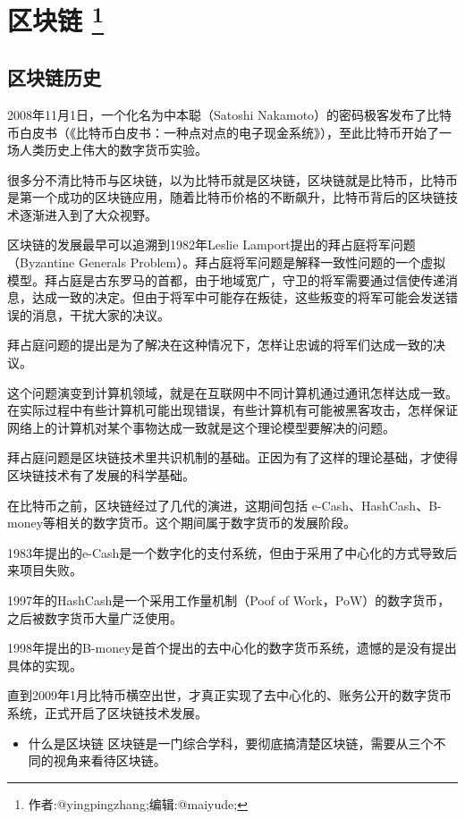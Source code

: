 \documentclass[]{ctexbook}
\providecommand{\tightlist}{%
  \setlength{\itemsep}{0pt}\setlength{\parskip}{0pt}}
\begin{document}
\chapter[区块链 ]{\texorpdfstring{区块链 \footnote{作者:@yingpingzhang;编辑:@maiyude;}}{区块链 }}

\hypertarget{blockchain-history}{%
\section{区块链历史}\label{blockchain-history}}

2008年11月1日，一个化名为中本聪（Satoshi Nakamoto）的密码极客发布了比特币白皮书（《比特币白皮书：一种点对点的电子现金系统》），至此比特币开始了一场人类历史上伟大的数字货币实验。

很多分不清比特币与区块链，以为比特币就是区块链，区块链就是比特币，比特币是第一个成功的区块链应用，随着比特币价格的不断飙升，比特币背后的区块链技术逐渐进入到了大众视野。

区块链的发展最早可以追溯到1982年Leslie Lamport提出的拜占庭将军问题（Byzantine Generals Problem）。拜占庭将军问题是解释一致性问题的一个虚拟模型。拜占庭是古东罗马的首都，由于地域宽广，守卫的将军需要通过信使传递消息，达成一致的决定。但由于将军中可能存在叛徒，这些叛变的将军可能会发送错误的消息，干扰大家的决议。

拜占庭问题的提出是为了解决在这种情况下，怎样让忠诚的将军们达成一致的决议。

这个问题演变到计算机领域，就是在互联网中不同计算机通过通讯怎样达成一致。在实际过程中有些计算机可能出现错误，有些计算机有可能被黑客攻击，怎样保证网络上的计算机对某个事物达成一致就是这个理论模型要解决的问题。

拜占庭问题是区块链技术里共识机制的基础。正因为有了这样的理论基础，才使得区块链技术有了发展的科学基础。

在比特币之前，区块链经过了几代的演进，这期间包括 e-Cash、HashCash、B-money等相关的数字货币。这个期间属于数字货币的发展阶段。

1983年提出的e-Cash是一个数字化的支付系统，但由于采用了中心化的方式导致后来项目失败。

1997年的HashCash是一个采用工作量机制（Poof of Work，PoW）的数字货币，之后被数字货币大量广泛使用。

1998年提出的B-money是首个提出的去中心化的数字货币系统，遗憾的是没有提出具体的实现。

直到2009年1月比特币横空出世，才真正实现了去中心化的、账务公开的数字货币系统，正式开启了区块链技术发展。

\begin{itemize}
\tightlist
\item
  什么是区块链
  区块链是一门综合学科，要彻底搞清楚区块链，需要从三个不同的视角来看待区块链。
\end{itemize}
\end{document}
